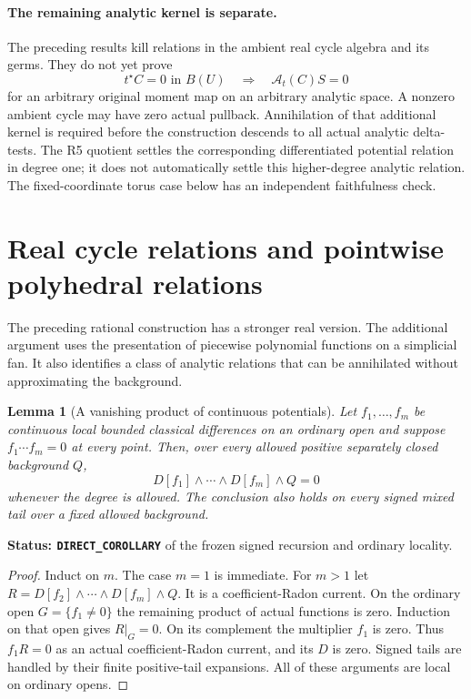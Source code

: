 \documentclass[11pt,a4paper]{article}
\numberwithin{equation}{section}
\newtheorem{lemma}[theorem]{Lemma}
\theoremstyle{definition}
\theoremstyle{remark}
\begin{document}
\paragraph{The remaining analytic kernel is separate.}
The preceding results kill relations in the ambient real
cycle algebra and its germs. They do not yet prove
\[
        t^\star C=0\text{ in }B(U)
             \quad\Longrightarrow\quad\mathcal A_t(C)S=0
\]
for an arbitrary original moment map on an arbitrary
analytic space. A nonzero ambient cycle may have zero
actual pullback. Annihilation of that additional kernel
is required before the construction descends to all
actual analytic delta-tests. The R5 quotient settles
the corresponding differentiated potential relation in
degree one; it does not automatically settle this
higher-degree analytic relation. The fixed-coordinate
torus case below has an independent faithfulness check.



\section{Real cycle relations and pointwise polyhedral relations}
\label{sec:r6-real-cycle-action}

The preceding rational construction has a stronger real
version. The additional argument uses the presentation of
piecewise polynomial functions on a simplicial fan. It
also identifies a class of analytic relations that can be
annihilated without approximating the background.

\begin{lemma}[A vanishing product of continuous potentials]
\label{lem:r6-zero-function-product}
Let $f_1,\ldots,f_m$ be continuous local bounded classical
differences on an ordinary open and suppose
$f_1\cdots f_m=0$ at every point. Then, over every allowed
positive separately closed background $Q$,
\[
                      D[f_1]\wedge\cdots\wedge D[f_m]\wedge Q=0
\]
whenever the degree is allowed. The conclusion also holds
on every signed mixed tail over a fixed allowed background.
\end{lemma}

\noindent\textbf{Status: \texttt{DIRECT\_COROLLARY}} of
the frozen signed recursion and ordinary locality.

\begin{proof}
Induct on $m$. The case $m=1$ is immediate. For $m>1$
let $R=D[f_2]\wedge\cdots\wedge D[f_m]\wedge Q$.
It is a coefficient-Radon current. On the ordinary open
$G=\{f_1\ne0\}$ the remaining product of actual functions
is zero. Induction on that open gives $R|_G=0$.
On its complement the multiplier $f_1$ is zero. Thus
$f_1R=0$ as an actual coefficient-Radon current, and its
$D$ is zero. Signed tails are handled by their finite
positive-tail expansions. All of these arguments are
local on ordinary opens.
\end{proof}
\end{document}
